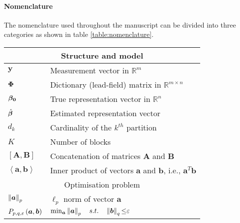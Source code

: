 \paragraph{Nomenclature}
The nomenclature used throughout the manuscript can be divided into three categories as shown in table \ref{table:nomenclature}.
\begin{table}[hb]
\begin{center}
\begin{tabular}{cc}
\toprule
\multicolumn{2}{c}{Structure and model} \\ 
\midrule
\multicolumn{1}{l}{$\boldsymbol{y}$} & \multicolumn{1}{l}{Measurement vector in $\mathbb{R}^{m}$} \\ 
\multicolumn{1}{l}{$\boldsymbol{\Phi}$} & \multicolumn{1}{l}{Dictionary (lead-field) matrix in $\mathbb{R}^{m \times n}$} \\
\multicolumn{1}{l}{$\boldsymbol{\beta_0}$} & \multicolumn{1}{l}{True representation vector in $\mathbb{R}^{n}$}   \\
\multicolumn{1}{l}{$\hat{\boldsymbol{\beta}}$} & \multicolumn{1}{l}{Estimated representation vector}   \\ 
\multicolumn{1}{l}{$d_k$} & \multicolumn{1}{l}{Cardinality of the $k^{th}$ partition}   \\ %
\multicolumn{1}{l}{$K$} & \multicolumn{1}{l}{Number of blocks}   \\
\multicolumn{1}{l}{$[ \boldsymbol{A} , \boldsymbol{B} ]$} & \multicolumn{1}{l}{Concatenation of matrices $\boldsymbol{A}$ and $\boldsymbol{B}$}   \\
\multicolumn{1}{l}{$\left\langle \boldsymbol{a} , \boldsymbol{b} \right\rangle$} & \multicolumn{1}{l}{Inner product of vectors $\boldsymbol{a}$ and $\boldsymbol{b}$, i.e., $\boldsymbol{a}^T \boldsymbol{b}$}   \\
\midrule
\multicolumn{2}{c}{Optimisation problem} \\ 
\midrule
\multicolumn{1}{l}{$\left\lVert\boldsymbol{a}\right\rVert_p$} & \multicolumn{1}{l}{$\ell_p$ norm of vector $\boldsymbol{a}$}   \\
\multicolumn{1}{l}{$P_{p,q,\varepsilon} \left( \boldsymbol{a},\boldsymbol{b} \right)$} & \multicolumn{1}{l}{$\min_{\boldsymbol{a}} \left\lVert\boldsymbol{a}\right\rVert_p \quad s.t. \quad \left\lVert\boldsymbol{b}\right\rVert_q {\leq} \varepsilon$}   \\

\end{tabular}
\end{center}
\end{table}

